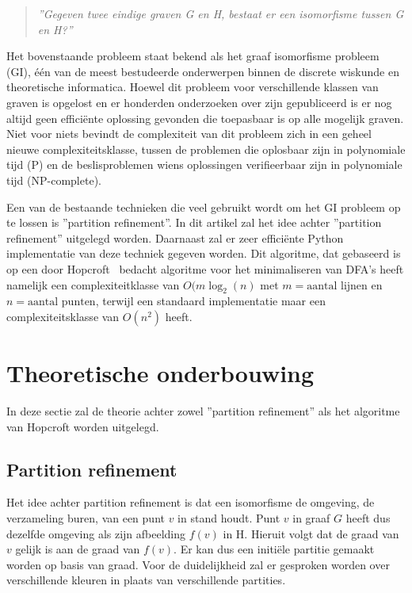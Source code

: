 \documentclass[twoside]{article}
\begin{document}
\begin{multicols}{2} %



\begin{quote}
\textit{''Gegeven twee eindige graven G en H, bestaat er een isomorfisme tussen G en H?''}
\end{quote}

Het bovenstaande probleem staat bekend als het graaf isomorfisme probleem  (GI), één van de meest bestudeerde onderwerpen binnen de discrete wiskunde en theoretische informatica. Hoewel dit probleem voor verschillende klassen van graven is opgelost  en er honderden onderzoeken over zijn gepubliceerd is er nog altijd geen efficiënte oplossing gevonden die toepasbaar is op alle mogelijk graven. Niet voor niets bevindt de complexiteit van dit probleem zich in een geheel nieuwe complexiteitsklasse, tussen de problemen die oplosbaar zijn in polynomiale tijd (P) en de beslisproblemen wiens oplossingen verifieerbaar zijn in polynomiale tijd (NP-complete).

Een van de bestaande technieken die veel gebruikt wordt om het GI probleem op te lossen is ''partition refinement''. In dit artikel zal het idee achter ''partition refinement'' uitgelegd worden. Daarnaast zal er zeer effici\"ente Python implementatie van deze techniek gegeven worden. Dit algoritme, dat gebaseerd is op een door Hopcroft~\cite{MR0403320} bedacht algoritme voor het minimaliseren van DFA's heeft namelijk een complexiteitklasse van $O(m \log_{2} (n)$ met $m= \text{aantal lijnen}$ en $n = \text{aantal punten}$, terwijl een standaard implementatie maar een complexiteitsklasse van $O(n^2)$ heeft.

\section{Theoretische onderbouwing}
In deze sectie zal de theorie achter zowel ''partition refinement'' als het algoritme van Hopcroft worden uitgelegd.

\subsection{Partition refinement}
Het idee achter partition refinement is dat een isomorfisme de omgeving, de verzameling buren, van een punt $v$ in stand houdt. Punt $v$ in graaf $G$ heeft dus dezelfde omgeving als zijn afbeelding $f(v)$ in H. Hieruit volgt dat de graad van $v$ gelijk is aan de graad van $f(v)$. Er kan dus een initi\"ele partitie gemaakt worden op basis van graad. Voor de duidelijkheid zal er gesproken worden over verschillende kleuren in plaats van verschillende partities.


\end{multicols}
\end{document}
